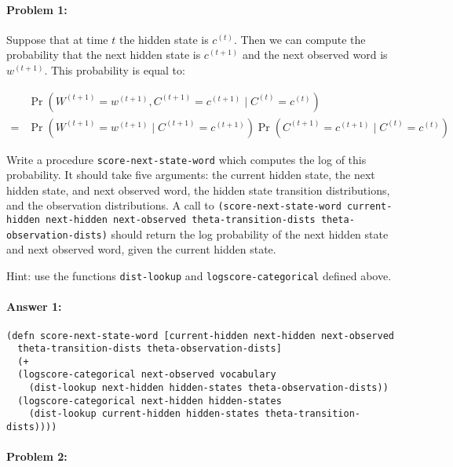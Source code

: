\documentclass[12pt, letterpaper]{article}
\begin{document}
\pagestyle{fancy}
\paragraph{Problem 1:}

Suppose that at time $t$ the hidden state is $c^{(t)}$. Then we can
compute the probability that the next hidden state is $c^{(t+1)}$ and
the next observed word is $w^{(t+1)}$. This probability is equal to:

\begin{align*} 
&\Pr(W^{(t+1)} = w^{(t+1)}, C^{(t+1)} =c^{(t+1)} \mid C^{(t)} = c^{(t)}) \\ 
=   &\Pr(W^{(t+1)} = w^{(t+1)} \mid C^{(t+1)}=c^{(t+1)}) \Pr(C^{(t+1)} =c^{(t+1)} \mid C^{(t)} = c^{(t)})
  \end{align*}

  Write a procedure \texttt{score-next-state-word} which computes the
  log of this probability. It should take five arguments: the current
  hidden state, the next hidden state, and next observed word, the
  hidden state transition distributions, and the observation
  distributions. A call to \texttt{(score-next-state-word
    current-hidden next-hidden next-observed theta-transition-dists
    theta-observation-dists)} should return the log probability of the
  next hidden state and next observed word, given the current hidden
  state.

  \noindent Hint: use the functions \texttt{dist-lookup} and
  \texttt{logscore-categorical} defined above.

\paragraph{Answer 1:}\begin{lstlisting}
(defn score-next-state-word [current-hidden next-hidden next-observed 
  theta-transition-dists theta-observation-dists]
  (+ 
  (logscore-categorical next-observed vocabulary 
    (dist-lookup next-hidden hidden-states theta-observation-dists))
  (logscore-categorical next-hidden hidden-states 
    (dist-lookup current-hidden hidden-states theta-transition-dists))))
\end{lstlisting}

\hrulefill
\paragraph{Problem 2:}
\end{document}
